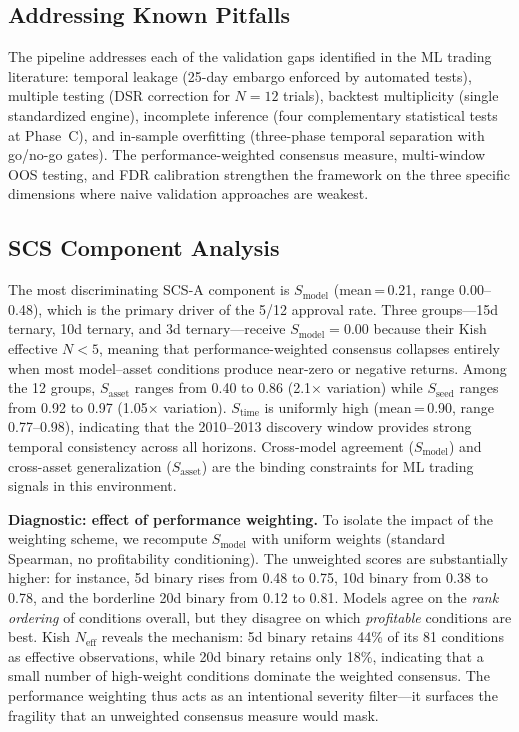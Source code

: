 \documentclass[12pt,a4paper]{article}
\begin{document}
\subsection{Addressing Known Pitfalls}

The pipeline addresses each of the validation gaps identified in the ML trading literature: temporal leakage (25-day embargo enforced by automated tests), multiple testing (DSR correction for $N=12$ trials), backtest multiplicity (single standardized engine), incomplete inference (four complementary statistical tests at Phase~C), and in-sample overfitting (three-phase temporal separation with go/no-go gates). The performance-weighted consensus measure, multi-window OOS testing, and FDR calibration strengthen the framework on the three specific dimensions where naive validation approaches are weakest.

\subsection{SCS Component Analysis}

The most discriminating SCS-A component is $S_{\text{model}}$ (mean\,=\,0.21, range 0.00--0.48), which is the primary driver of the 5/12 approval rate. Three groups---15d ternary, 10d ternary, and 3d ternary---receive $S_{\text{model}} = 0.00$ because their Kish effective $N < 5$, meaning that performance-weighted consensus collapses entirely when most model--asset conditions produce near-zero or negative returns. Among the 12 groups, $S_{\text{asset}}$ ranges from 0.40 to 0.86 (2.1$\times$ variation) while $S_{\text{seed}}$ ranges from 0.92 to 0.97 (1.05$\times$ variation). $S_{\text{time}}$ is uniformly high (mean\,=\,0.90, range 0.77--0.98), indicating that the 2010--2013 discovery window provides strong temporal consistency across all horizons. Cross-model agreement ($S_{\text{model}}$) and cross-asset generalization ($S_{\text{asset}}$) are the binding constraints for ML trading signals in this environment.

\textbf{Diagnostic: effect of performance weighting.} To isolate the impact of the weighting scheme, we recompute $S_{\text{model}}$ with uniform weights (standard Spearman, no profitability conditioning). The unweighted scores are substantially higher: for instance, 5d binary rises from 0.48 to 0.75, 10d binary from 0.38 to 0.78, and the borderline 20d binary from 0.12 to 0.81. Models agree on the \emph{rank ordering} of conditions overall, but they disagree on which \emph{profitable} conditions are best. Kish $N_{\text{eff}}$ reveals the mechanism: 5d binary retains 44\% of its 81 conditions as effective observations, while 20d binary retains only 18\%, indicating that a small number of high-weight conditions dominate the weighted consensus. The performance weighting thus acts as an intentional severity filter---it surfaces the fragility that an unweighted consensus measure would mask.
\end{document}
